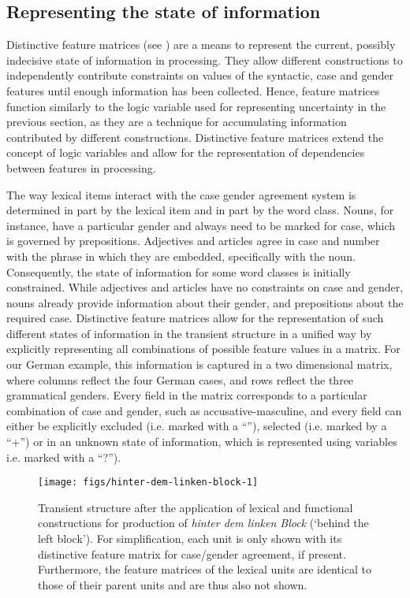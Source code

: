 \subsection{Representing the state of information}
Distinctive feature matrices (see \citealt{vantrijp2011matrices}) are a means to
represent the current, possibly indecisive state of information in
processing. They allow different constructions to independently
contribute constraints on values of the syntactic, case and gender
features until enough information has been collected. Hence, feature
matrices function similarly to the logic variable used for
representing uncertainty in the previous section, as they are a
technique for accumulating information contributed by different
constructions. Distinctive feature matrices extend the concept of
logic variables and allow for the representation of dependencies between features
in processing.

The way lexical items interact with the case gender agreement system
is determined in part by the lexical item and in part by the word
class. Nouns, for instance, have a particular gender and always need to be marked for case,
which is governed by prepositions. Adjectives and articles
agree in case and number with the phrase in which they are embedded,
specifically with the noun. Consequently, the state of information for
some word classes is initially constrained. While adjectives and
articles have no constraints on case and gender, nouns already provide
information about their gender, and prepositions about the required
case. Distinctive feature matrices allow for the representation of such different
states of information in the transient structure in a unified way by
explicitly representing all combinations of possible feature values
in a matrix. For our German example, this information is captured in
a two dimensional matrix, where columns reflect the four German cases,
and rows reflect the three grammatical genders. Every field in the
matrix corresponds to a particular combination of case and gender,
such as accusative-masculine, and every field can either be explicitly
excluded (i.e. marked with a ``{\textminus}''), selected (i.e.  marked by a ``+'') or
in an unknown state of information, which is represented using
variables i.e. marked with a ``?'').

\begin{figure}[t]
  \centerline{\texttt{[image: figs/hinter-dem-linken-block-1]}}
  \caption[Transient structure after the application of lexical and
    functional constructions]{Transient structure after the application of lexical and
    functional constructions for production of \textit{hinter dem linken
    Block} (`behind the left block'). For simplification, each unit
    is only shown with its distinctive feature matrix for case/gender
    agreement, if present. Furthermore, the feature matrices of the
    lexical units are identical to those of their parent units and are
    thus also not shown.}
  \label{f:hinter-dem-linken-block-1}
\end{figure}

